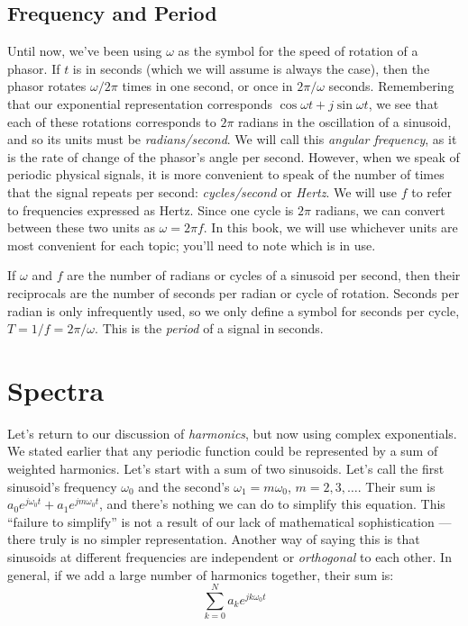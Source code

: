 \subsection*{Frequency and Period}

\index{$\omega$}
Until now, we've been using $\omega$ as the symbol for the speed of
rotation of a phasor. If $t$ is in seconds (which we will assume is
always the case), then the phasor rotates $\omega/2\pi$ times in one
second, or once in $2\pi/\omega$ seconds. Remembering that our
exponential representation corresponds $\cos \omega t + j \sin \omega
t$, we see that each of these rotations corresponds to $2\pi$ radians
in the oscillation of a sinusoid, and so its units must be
\emph{radians/second}. We will call this \emph{angular frequency}, as
it is the rate of change of the phasor's angle per second. However,
when we speak of periodic physical signals, it is more convenient to
speak of the number of times that the signal repeats per second:
\emph{cycles/second} or \emph{Hertz}. We will use $f$ to refer to
frequencies expressed as Hertz. Since one cycle is $2\pi$ radians, we
can convert between these two units as $\omega = 2\pi f$. In this
book, we will use whichever units are most convenient for each topic;
you'll need to note which is in use.

If $\omega$ and $f$ are the number of radians or cycles of a sinusoid
per second, then their reciprocals are the number of seconds per
radian or cycle of rotation. Seconds per radian is only infrequently
used, so we only define a symbol for seconds per cycle, $T = 1/f =
2\pi/\omega$. This is the \emph{period} of a signal in seconds.

\section{Spectra}

Let's return to our discussion of \emph{harmonics}, but now using complex exponentials. We stated earlier that any periodic function could be represented by a sum of weighted harmonics. Let's start with a sum of two sinusoids.
Let's call the first sinusoid's frequency $\omega_0$ and the second's
$\omega_1 = m\omega_0$, $m=2, 3, \ldots$. Their sum is $a_0
e^{j\omega_0 t} + a_1 e^{jm\omega_0 t}$, and there's nothing we can do
to simplify this equation. This ``failure to simplify'' is not a
result of our lack of mathematical sophistication --- there truly is
no simpler representation. Another way of saying this is that
sinusoids at different frequencies are independent or
\emph{orthogonal} to each other. %
%
%
%
%
In general, if we add a large number
of harmonics together, their sum is:
\begin{equation}
\sum_{k=0}^N a_k e^{jk\omega_0 t}
\label{eq:sum-harmonics}
\end{equation}

